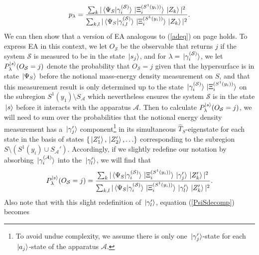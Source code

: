 \begin{equation}\label{plambda}
p_{\lambda}=\frac{\sum_k |\ip*{\Psi_S}{\gamma_i^{(\mathcal{S})}}\ket*{\Xi_i^{(S^1(y_i))}}\ket*{Z_k}|^2}{\sum_{k,l} |\ip*{\Psi_S}{\gamma_{i,l}^{(\mathcal{S})}}\ket*{\Xi_i^{(S^1(y_i))}}\ket*{Z_k}|^2}.
\end{equation}
We can then show that a version of EA analogous to (\ref{adeq}) on page \pageref{adeq} holds. To express EA in this context, we let
$O_{\mathcal{S}}$ %
%
 be the observable that returns $j$ if the system $\mathcal{S}$ is measured to be in the state $\ket*{s_j}$, and for $\lambda = \ket*{\gamma_i^{(\mathcal{S})}}$, we let $P_\lambda^{\ket*{s}}(O_{\mathcal{S}}=j)$ denote the probability that $O_{\mathcal{S}}=j$ given that the hypersurface is in state $\ket*{\Psi_S}$ before the notional mass-energy density measurement on $S$, and that this measurement result is only determined up to the state $\ket*{\gamma_i^{(\mathcal{S})}}\ket*{\Xi_i^{(S^1(y_i))}}$ on the subregion $S^1(y_1)\setminus S_{\mathcal{A}}$ which nevertheless ensures the system $\mathcal{S}$ is in the  state $\ket*{s}$ before it interacts with the apparatus $\mathcal{A}$. Then to calculate $P_\lambda^{\ket*{s}}(O_{\mathcal{S}}=j)$, we will need to sum over the probabilities that the notional energy density measurement has a $\ket*{\gamma_j'}$ component\footnote{To avoid undue complexity, we assume there is only one $\ket*{\gamma_j'}$-state for each $\ket*{a_j}$-state of the apparatus $\mathcal{A}$.} in its simultaneous $\hat{T}_S$-eigenstate for each state in the basis of states  $\{\ket*{Z_1'},\ket*{Z_2'},\ldots\}$ %
  corresponding to the subregion $S\setminus(S^{1}(y_i)\cup S_{\mathcal{A}}')$. Accordingly, if we slightly redefine our notation by absorbing $\ket*{\gamma_i^{(\mathcal{A})}}$ into the $\ket*{\gamma_l'}$, we will find that   
\begin{equation*}
P_\lambda^{\ket*{s}}(O_{\mathcal{S}}=j)=\frac{\sum_k|\ip*{\Psi_S}{\gamma_i^{(\mathcal{S})}}\ket*{\Xi_i^{(S^1(y_i))}}\ket*{\gamma_j'}\ket*{Z_k'}|^2}{\sum_{k,l}|\ip*{\Psi_S}{\gamma_i^{(\mathcal{S})}}\ket*{\Xi_i^{(S^1(y_i))}}\ket*{\gamma_l'}\ket*{Z_k'}|^2}.
\end{equation*} 
Also note that with this slight redefinition of $\ket*{\gamma_l'}$,  equation (\ref{PsiSdecomp}) becomes
